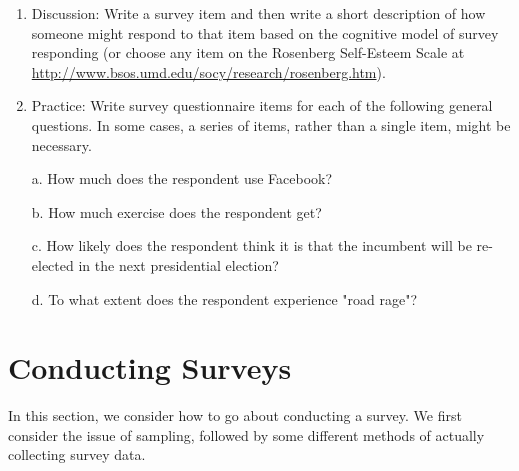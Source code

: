 \begin{fullwidth}

\begin{enumerate}

\item  Discussion: Write a survey item and then write a short description of how someone might respond to that item based on the cognitive model of survey responding (or choose any item on the Rosenberg Self-Esteem Scale at \url{http://www.bsos.umd.edu/socy/research/rosenberg.htm}).

\item Practice: Write survey questionnaire items for each of the following general questions. In some cases, a series of items, rather than a single item, might be necessary.

a. How much does the respondent use Facebook?

b. How much exercise does the respondent get?

c. How likely does the respondent think it is that the incumbent will be re-elected in the next presidential election?

d. To what extent does the respondent experience "road rage"?
 

\end{enumerate}

\end{fullwidth}  

\newpage
\section{Conducting Surveys}
  

 
In this section, we consider how to go about conducting a survey. We first consider the issue of sampling, followed by some different methods of actually collecting survey data.


